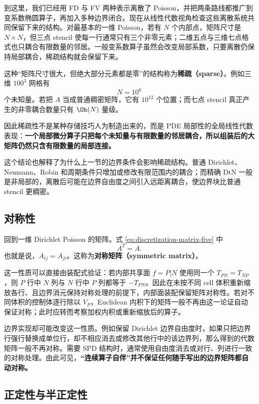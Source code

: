 到这里，我们已经用 FD 与 FV 两种表示离散了 Poisson，并把两条路线都推广到变系数椭圆算子，再加入多种边界闭合。现在从线性代数视角检查这些离散系统共同保留下来的结构。对最基本的一维 Poisson，若有 $N$ 个内部点，矩阵尺寸是 $N\times N$，但三点 stencil 使每一行通常只有三个非零元素；二维五点与三维七点格式也只耦合有限数量的邻居。一般变系数算子虽然会改变局部系数，只要离散仍保持局部耦合，稀疏结构就会保留下来。

这种“矩阵尺寸很大，但绝大部分元素都是零”的结构称为\textbf{稀疏（sparse）}。例如三维 $100^3$ 网格有
\begin{equation}
N=10^6
\end{equation}
个未知量。若把 $A$ 当成普通稠密矩阵，它有 $10^{12}$ 个位置；而七点 stencil 真正产生的非零耦合数量只有 $\Oh(N)$ 量级。

因此稀疏性不是某种存储技巧人为制造出来的，而是 PDE 局部性的全局线性代数表现：\textbf{一个局部微分算子只把每个未知量与有限数量的邻居耦合，所以组装后的大矩阵仍然只含有限数量的局部连接。}

这个结论也解释了为什么上一节的边界条件会影响稀疏结构。普通 Dirichlet、Neumann、Robin 和周期条件只增加或修改有限范围内的耦合；而精确 DtN 一般是非局部的，离散后可能在边界自由度之间引入远距离耦合，使边界块比普通 stencil 更稠密。

\subsection{对称性}

回到一维 Dirichlet Poisson 的矩阵。式 \eqref{eq:discretization-matrix-five} 中
\begin{equation}
A^T=A.
\end{equation}
也就是说，$A_{ij}=A_{ji}$。这称为\textbf{对称矩阵（symmetric matrix）}。

这一性质可以直接由装配式验证：若内部共享面 $f=P|N$ 使用同一个 $T_{PN}=T_{NP}$，则 $P$ 行中 $N$ 列与 $N$ 行中 $P$ 列都等于 $-T_{PN}$。因此在未按不同 cell 体积重新缩放各行、且边界消元保持对称处理的前提下，内部面装配保留矩阵对称性。若对不同体积的控制体逐行除以 $V_P$，Euclidean 内积下的矩阵一般不再由这一论证自动保证对称；此时应转而考察加权内积或重新缩放后的算子。

边界实现却可能改变这一性质。例如保留 Dirichlet 边界自由度时，如果只把边界行强行替换成单位行，却不相应消去或修改其他行中的该边界列，那么得到的代数矩阵一般不再对称。需要 SPD 结构时，通常使用自由度消去或对行、列进行一致的对称处理。由此可见，\textbf{“连续算子自伴”并不保证任何随手写出的边界矩阵都自动对称。}

\subsection{正定性与半正定性}

